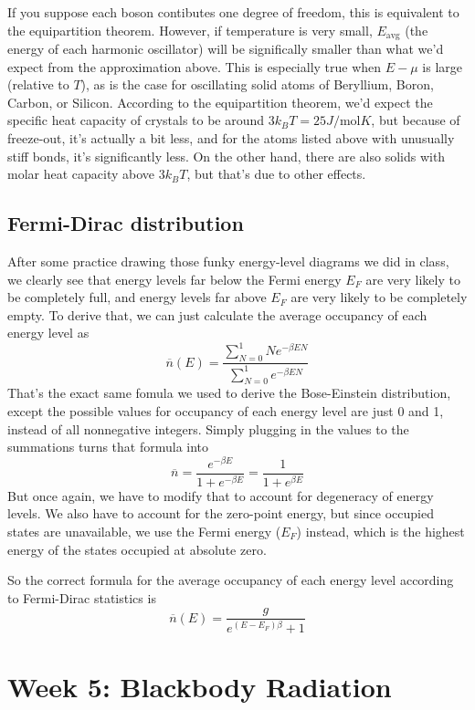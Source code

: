 \documentclass[12pt]{article}
\begin{document}
If you suppose each boson contibutes one degree of freedom, this is equivalent to the equipartition theorem. However, if temperature is very small, $E_\text{avg}$ (the energy of each harmonic oscillator) will be significally smaller than what we'd expect from the approximation above. This is especially true when $E - \mu$ is large (relative to $T$), as is the case for oscillating solid atoms of Beryllium, Boron, Carbon, or Silicon. According to the equipartition theorem, we'd expect the specific heat capacity of crystals to be around $3 k_B T = 25 J / \text{mol} K$, but because of freeze-out, it's actually a bit less, and for the atoms listed above with unusually stiff bonds, it's significantly less. On the other hand, there are also solids with molar heat capacity above $3 k_B T$, but that's due to other effects.

\subsection{Fermi-Dirac distribution}
After some practice drawing those funky energy-level diagrams we did in class, we clearly see that energy levels far below the Fermi energy $E_F$ are very likely to be completely full, and energy levels far above $E_F$ are very likely to be completely empty. To derive that, we can just calculate the average occupancy of each energy level as
\[\overline{n} (E) = \frac{\sum\limits_{N=0}^1 N e^{- \beta E N}}{\sum\limits_{N=0}^1 e^{- \beta E N}} \]
That's the exact same fomula we used to derive the Bose-Einstein distribution, except the possible values for occupancy of each energy level are just 0 and 1, instead of all nonnegative integers. Simply plugging in the values to the summations turns that formula into
\[\overline{n} = \frac{e^{- \beta E}}{1 + e^{- \beta E}} = \frac{1}{1 + e^{\beta E}} \]
But once again, we have to modify that to account for degeneracy of energy levels. We also have to account for the zero-point energy, but since occupied states are unavailable, we use the Fermi energy ($E_F$) instead, which is the highest energy of the states occupied at absolute zero.

So the correct formula for the average occupancy of each energy level according to Fermi-Dirac statistics is
\[\overline{n}(E) = \frac{g}{e^{(E - E_F) \beta} + 1} \]

\section{Week 5: Blackbody Radiation}
\end{document}
